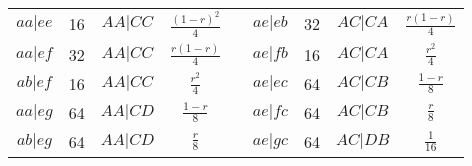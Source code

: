\begin{center}
\begin{tabular}{ccccccccc}
$aa|ee$ & 16 & $AA|CC$ & $\frac{(1-r)^2}{4}$ &&
$ae|eb$ & 32 & $AC|CA$ & $\frac{r(1-r)}{4}$ \\ 
$aa|ef$ & 32 & $AA|CC$ & $\frac{r(1-r)}{4}$ &&
$ae|fb$ & 16 & $AC|CA$ & $\frac{r^2}{4}$ \\ 
$ab|ef$ & 16 & $AA|CC$ & $\frac{r^2}{4}$ &&
$ae|ec$ & 64 & $AC|CB$ & $\frac{1-r}{8}$ \\ 
$aa|eg$ & 64 & $AA|CD$ & $\frac{1-r}{8}$ &&
$ae|fc$ & 64 & $AC|CB$ & $\frac{r}{8}$ \\ 
$ab|eg$ & 64 & $AA|CD$ & $\frac{r}{8}$ &&
$ae|gc$ & 64 & $AC|DB$ & $\frac{1}{16}$ \\ 
\cline{6-9}
\cline{1-4} \cline{6-9} 
\end{tabular} \end{center}
